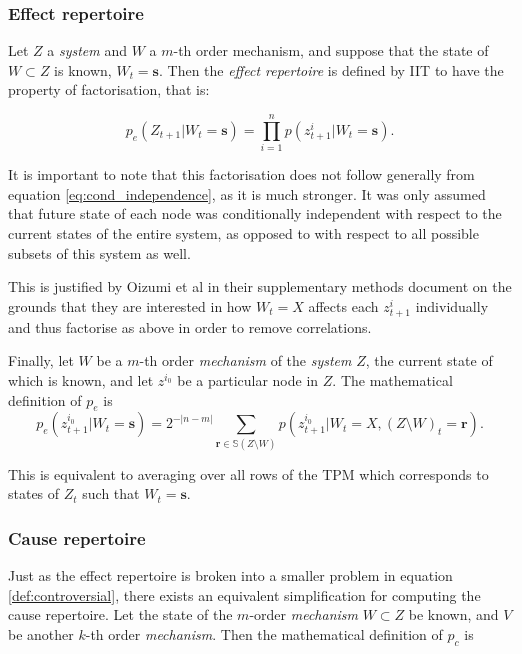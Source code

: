 \subsubsection{Effect repertoire}

Let $Z$ a \textit{system} and $W$ a $m$-th order mechanism, and suppose that the state of $W \subset Z$ is known, $W_t = \mathbf{s}$. Then the  \textit{effect repertoire} is defined by IIT \cite{oizumi2014phenomenology} to have the property of factorisation, that is:

\begin{equation}
\label{def:controversial}
p_e(Z_{t+1}|W_t = \mathbf{s}) = \prod \limits_{i= 1}^n p(z^i_{t+1}|W_t = \mathbf{s}).
\end{equation}

It is important to note that this factorisation does not follow generally from equation \ref{eq:cond_independence}, as it is much stronger. It was only assumed that future state of each node was conditionally independent with respect to the current states of the entire system, as opposed to with respect to all possible subsets of this system as well.

This is justified by Oizumi et al \cite{oizumi2014phenomenology} in their supplementary methods document on the grounds that they are interested in how $W_t=X$ affects each $z^i_{t+1}$ individually and thus factorise as above in order to remove correlations.


Finally, let $W$ be a $m$-th order \textit{mechanism} of the \textit{system} $Z$, the current state of which is known, and let $z^{i_0}$ be a particular node in $Z$. The mathematical definition \cite{krohn2016computing} of $p_e$ is
\begin{equation}
\label{def:effect_repertoire}
p_e(z_{t+1}^{i_0}|W_t = \mathbf{s}) = 2^{-|n-m|}\sum \limits_{\mathbf{r} \in \mathbb{S}(Z\setminus W)} p(z_{t+1}^{i_0}|W_t = X, (Z\setminus W)_t = \mathbf{r}).
\end{equation}

This is equivalent to averaging over all rows of the TPM which corresponds to states of $Z_t$ such that $ W_t = \mathbf{s} $.


\subsubsection{Cause repertoire}

Just as the effect repertoire is broken into a smaller problem in equation \ref{def:controversial}, there exists an equivalent simplification for computing the cause repertoire. Let the state of the $m$-order \textit{mechanism} $W \subset Z$ be known, and $V$ be another $k$-th order \textit{mechanism}. Then the mathematical definition \cite{krohn2016computing} of $p_c$ is

